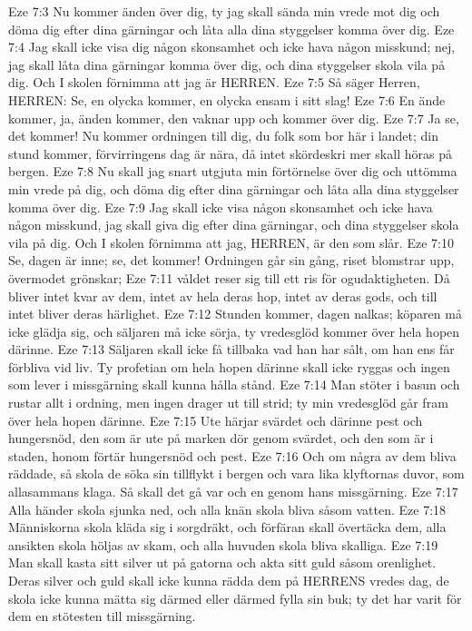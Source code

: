 Eze 7:3  Nu kommer änden över dig, ty jag skall sända min vrede mot dig och döma dig efter dina gärningar och låta alla dina styggelser komma över dig.
Eze 7:4  Jag skall icke visa dig någon skonsamhet och icke hava någon misskund; nej, jag skall låta dina gärningar komma över dig, och dina styggelser skola vila på dig. Och I skolen förnimma att jag är HERREN.
Eze 7:5  Så säger Herren, HERREN: Se, en olycka kommer, en olycka ensam i sitt slag!
Eze 7:6  En ände kommer, ja, änden kommer, den vaknar upp och kommer över dig.
Eze 7:7  Ja se, det kommer! Nu kommer ordningen till dig, du folk som bor här i landet; din stund kommer, förvirringens dag är nära, då intet skördeskri mer skall höras på bergen.
Eze 7:8  Nu skall jag snart utgjuta min förtörnelse över dig och uttömma min vrede på dig, och döma dig efter dina gärningar och låta alla dina styggelser komma över dig.
Eze 7:9  Jag skall icke visa någon skonsamhet och icke hava någon misskund, jag skall giva dig efter dina gärningar, och dina styggelser skola vila på dig. Och I skolen förnimma att jag, HERREN, är den som slår.
Eze 7:10  Se, dagen är inne; se, det kommer! Ordningen går sin gång, riset blomstrar upp, övermodet grönskar;
Eze 7:11  våldet reser sig till ett ris för ogudaktigheten. Då bliver intet kvar av dem, intet av hela deras hop, intet av deras gods, och till intet bliver deras härlighet.
Eze 7:12  Stunden kommer, dagen nalkas; köparen må icke glädja sig, och säljaren må icke sörja, ty vredesglöd kommer över hela hopen därinne.
Eze 7:13  Säljaren skall icke få tillbaka vad han har sålt, om han ens får förbliva vid liv. Ty profetian om hela hopen därinne skall icke ryggas och ingen som lever i missgärning skall kunna hålla stånd.
Eze 7:14  Man stöter i basun och rustar allt i ordning, men ingen drager ut till strid; ty min vredesglöd går fram över hela hopen därinne.
Eze 7:15  Ute härjar svärdet och därinne pest och hungersnöd, den som är ute på marken dör genom svärdet, och den som är i staden, honom förtär hungersnöd och pest.
Eze 7:16  Och om några av dem bliva räddade, så skola de söka sin tillflykt i bergen och vara lika klyftornas duvor, som allasammans klaga. Så skall det gå var och en genom hans missgärning.
Eze 7:17  Alla händer skola sjunka ned, och alla knän skola bliva såsom vatten.
Eze 7:18  Människorna skola kläda sig i sorgdräkt, och förfäran skall övertäcka dem, alla ansikten skola höljas av skam, och alla huvuden skola bliva skalliga.
Eze 7:19  Man skall kasta sitt silver ut på gatorna och akta sitt guld såsom orenlighet. Deras silver och guld skall icke kunna rädda dem på HERRENS vredes dag, de skola icke kunna mätta sig därmed eller därmed fylla sin buk; ty det har varit för dem en stötesten till missgärning.
